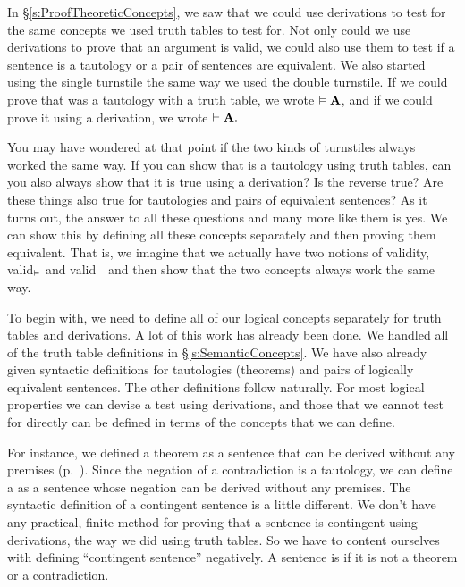 In \S\ref{s:ProofTheoreticConcepts}, we saw that we could use derivations to test for the same concepts we used truth tables to test for. Not only could we use derivations to prove that an argument is valid, we could also use them to test if a sentence is a tautology or a pair of sentences are equivalent. We also started using the single turnstile the same way we used the double turnstile. If we could prove that  was a tautology with a truth table, we wrote $\vDash \mathbf{A}$, and if we could prove it using a derivation, we wrote $\vdash \mathbf{A}.$ 

You may have wondered at that point if the two kinds of turnstiles always worked the same way. If you can show that  is a tautology using truth tables, can you also always show that it is true using a derivation? Is the reverse true? Are these things also true for tautologies and pairs of equivalent sentences? As it turns out, the answer to all these questions and many more like them is yes. We can show this by defining all these concepts separately and then proving them equivalent. That is, we imagine that we actually have two notions of validity, valid$_{\vDash}$ and  valid$_{\vdash}$ and then show that the two concepts always work the same way. 

To begin with, we need to define all of our logical concepts separately for truth tables and derivations. A lot of this work has already been done. We handled all of the truth table definitions in \S\ref{s:SemanticConcepts}. We have also already given syntactic definitions for tautologies (theorems) and pairs of logically equivalent sentences. The other definitions follow naturally. For most logical properties we can devise a test using derivations, and those that we cannot test for directly can be defined in terms of the concepts that we can define.

For instance, we defined a theorem as a sentence that can be derived without any premises (p.~\pageref{def:syntactic_tautology_in_sl}). Since the negation of a contradiction is a tautology, we can define a  \label{def:syntactic_contradiction_in_sl} as a sentence whose negation can be derived without any premises. The syntactic definition of a contingent sentence is a little different. We don't have any practical, finite method for proving that a sentence is contingent using derivations, the way we did using truth tables. So we have to content ourselves with defining ``contingent sentence'' negatively. A sentence is  \label{def:syntactically_contingent_in_sl} if it is not a theorem or a contradiction. 
 

